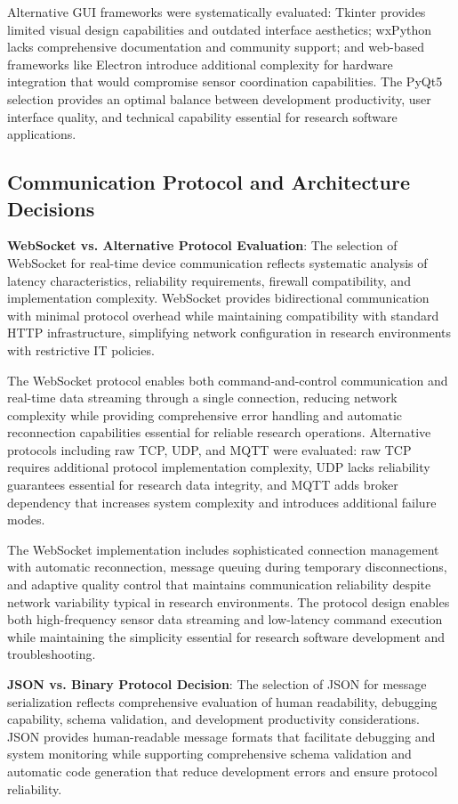 \documentclass[11pt,a4paper]{report}
\begin{document}
Alternative GUI frameworks were systematically evaluated: Tkinter provides limited visual design capabilities and outdated interface aesthetics; wxPython lacks comprehensive documentation and community support; and web-based frameworks like Electron introduce additional complexity for hardware integration that would compromise sensor coordination capabilities. The PyQt5 selection provides an optimal balance between development productivity, user interface quality, and technical capability essential for research software applications.

\subsection{Communication Protocol and Architecture Decisions}

\noindent \textbf{WebSocket vs. Alternative Protocol Evaluation}: The selection of WebSocket for real-time device communication reflects systematic analysis of latency characteristics, reliability requirements, firewall compatibility, and implementation complexity. WebSocket provides bidirectional communication with minimal protocol overhead while maintaining compatibility with standard HTTP infrastructure, simplifying network configuration in research environments with restrictive IT policies.

The WebSocket protocol enables both command-and-control communication and real-time data streaming through a single connection, reducing network complexity while providing comprehensive error handling and automatic reconnection capabilities essential for reliable research operations. Alternative protocols including raw TCP, UDP, and MQTT were evaluated: raw TCP requires additional protocol implementation complexity, UDP lacks reliability guarantees essential for research data integrity, and MQTT adds broker dependency that increases system complexity and introduces additional failure modes.

The WebSocket implementation includes sophisticated connection management with automatic reconnection, message queuing during temporary disconnections, and adaptive quality control that maintains communication reliability despite network variability typical in research environments. The protocol design enables both high-frequency sensor data streaming and low-latency command execution while maintaining the simplicity essential for research software development and troubleshooting.

\noindent \textbf{JSON vs. Binary Protocol Decision}: The selection of JSON for message serialization reflects comprehensive evaluation of human readability, debugging capability, schema validation, and development productivity considerations. JSON provides human-readable message formats that facilitate debugging and system monitoring while supporting comprehensive schema validation and automatic code generation that reduce development errors and ensure protocol reliability.
\end{document}

